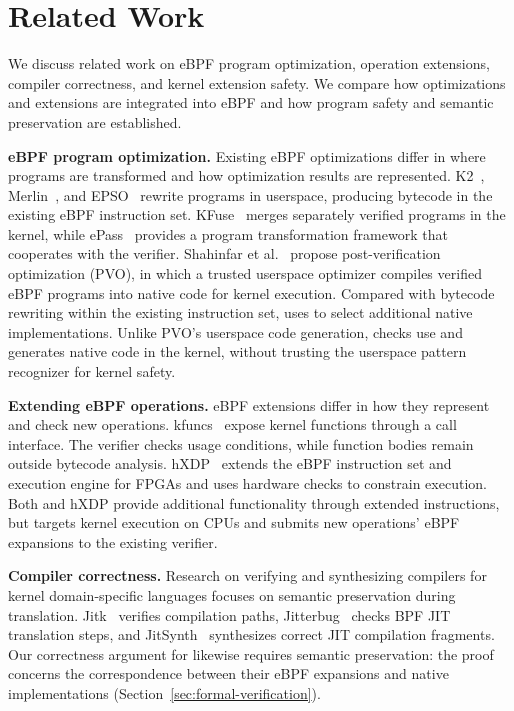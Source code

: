 \section{Related Work}
\label{sec:related}

We discuss related work on eBPF program optimization, operation extensions, compiler correctness, and kernel extension safety. We compare how optimizations and extensions are integrated into eBPF and how program safety and semantic preservation are established.

\noindent\textbf{eBPF program optimization.} Existing eBPF optimizations differ in where programs are transformed and how optimization results are represented. K2~\cite{xu2021synthesizing}, Merlin~\cite{mao2024merlin}, and EPSO~\cite{zhu2025epso} rewrite programs in userspace, producing bytecode in the existing eBPF instruction set. KFuse~\cite{kfuse} merges separately verified programs in the kernel, while ePass~\cite{xiang2025epass} provides a program transformation framework that cooperates with the verifier. Shahinfar et al.~\cite{shahinfar2026fun} propose post-verification optimization (PVO), in which a trusted userspace optimizer compiles verified eBPF programs into native code for kernel execution. Compared with bytecode rewriting within the existing instruction set, \tool uses \kinsns to select additional native implementations. Unlike PVO's userspace code generation, \tool checks \kinsn use and generates native code in the kernel, without trusting the userspace pattern recognizer for kernel safety.

\noindent\textbf{Extending eBPF operations.} eBPF extensions differ in how they represent and check new operations. kfuncs~\cite{kfuncs} expose kernel functions through a call interface. The verifier checks usage conditions, while function bodies remain outside bytecode analysis. hXDP~\cite{brunella2020hxdp} extends the eBPF instruction set and execution engine for FPGAs and uses hardware checks to constrain execution. Both \tool and hXDP provide additional functionality through extended instructions, but \tool targets kernel execution on CPUs and submits new operations' eBPF expansions to the existing verifier.

\noindent\textbf{Compiler correctness.} Research on verifying and synthesizing compilers for kernel domain-specific languages focuses on semantic preservation during translation. Jitk~\cite{wang2014jitk} verifies compilation paths, Jitterbug~\cite{nelson2020specification} checks BPF JIT translation steps, and JitSynth~\cite{vangeffen2020jitsynth} synthesizes correct JIT compilation fragments. Our correctness argument for \kinsns likewise requires semantic preservation: the proof concerns the correspondence between their eBPF expansions and native implementations (Section~\ref{sec:formal-verification}).

